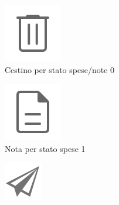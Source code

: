 \begin{figure}[H]
    \begin{subfigure}[t]{.18\textwidth}
        \centering
        \includegraphics[width=.5\columnwidth]{images/icons/icon_trash_g.png}
        \caption{Cestino per stato spese/note 0}
        \label{fig:cestino}
    \end{subfigure} \hspace{1.2mm}
    \begin{subfigure}[t]{.18\textwidth}
        \centering
        \includegraphics[width=.5\columnwidth]{images/icons/icon_paper_g.png}
        \caption{Nota per stato spese 1}
    \end{subfigure} \hspace{1.2mm}
    \begin{subfigure}[t]{.18\textwidth}
        \centering
        \includegraphics[width=.45\columnwidth]{images/icons/icon_send_g.png}

\end{subfigure}
\end{figure}
